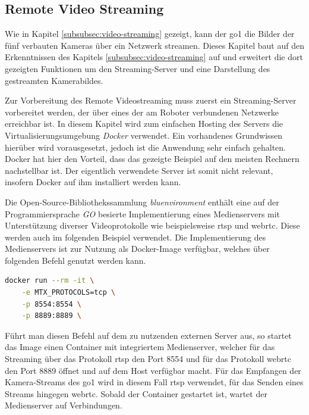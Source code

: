 \subsection{Remote Video Streaming}
\label{subsec:remote-video-streaming}

Wie in Kapitel \ref{subsubsec:video-streaming} gezeigt, kann der \gls{go1} die Bilder der fünf verbauten Kameras über
ein Netzwerk streamen.
Dieses Kapitel baut auf den Erkenntnissen des Kapitels \ref{subsubsec:video-streaming} auf und erweitert die dort gezeigten
Funktionen um den Streaming-Server und eine Darstellung des gestreamten Kamerabildes.


Zur Vorbereitung des Remote Videostreaming muss zuerst ein Streaming-Server vorbereitet werden, der über eines der am
Roboter verbundenen Netzwerke erreichbar ist.
In diesem Kapitel wird zum einfachen Hosting des Servers die Virtualisierungsumgebung \emph{Docker} verwendet.
Ein vorhandenes Grundwissen hierüber wird vorausgesetzt, jedoch ist die Anwendung sehr einfach gehalten.
Docker hat hier den Vorteil, dass das gezeigte Beispiel auf den meisten Rechnern nachstellbar ist.
Der eigentlich verwendete Server ist somit nicht relevant, insofern Docker auf ihm installiert werden kann.

Die Open-Source-Bibliothekssammlung \emph{bluenvironment} enthält eine auf der Programmiersprache \emph{GO} besierte
Implementierung eines Medienservers mit Unterstützung diverser Videoprotokolle wie beispielsweise \gls{rtsp} und
\gls{webrtc}.
Diese werden auch im folgenden Beispiel verwendet.
Die Implementierung des Medienservers ist zur Nutzung als Docker-Image verfügbar, welches über folgenden Befehl
genutzt werden kann.

\begin{lstlisting}[language=Bash]
docker run --rm -it \
    -e MTX_PROTOCOLS=tcp \
    -p 8554:8554 \
    -p 8889:8889 \
\end{lstlisting}

Führt man diesen Befehl auf dem zu nutzenden externen Server aus, so startet das Image einen Container mit integriertem
Medienserver, welcher für das Streaming über das Protokoll \gls{rtsp} den Port \num{8554} und für das Protokoll \gls{webrtc}
den Port \num{8889} öffnet und auf dem Host verfügbar macht.
Für das Empfangen der Kamera-Streams des \gls{go1} wird in diesem Fall \gls{rtsp} verwendet, für das Senden eines Streams
hingegen \gls{webrtc}.
Sobald der Container gestartet ist, wartet der Medienserver auf Verbindungen.

